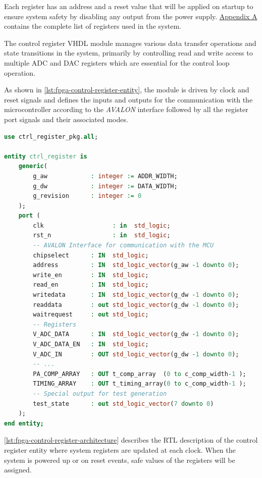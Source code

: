 Each register has an address and a reset value that will be applied on startup
to ensure system safety by disabling any output from the power supply.
\hyperref[sec:hvs-fpga-register-map]{Appendix A} contains the complete list
of registers used in the system.


The control register VHDL module manages various data transfer operations and
state transitions in the system, primarily by controlling read and write access
to multiple \acs{ADC} and \acs{DAC} registers which are essential for the
control loop operation.

As shown in \autoref{lst:fpga-control-register-entity}, the module is driven
by clock and reset signals and defines the inputs and outputs for the
communication with the microcontroller according to the \emph{AVALON} interface
followed by all the register port signals and their associated modes.

\begin{lstlisting}[language=VHDL, caption={Control registers entity},
    label={lst:fpga-control-register-entity}]
use ctrl_register_pkg.all;

entity ctrl_register is
    generic(
        g_aw            : integer := ADDR_WIDTH;
        g_dw            : integer := DATA_WIDTH;
        g_revision      : integer := 0
    );
    port (
        clk                   : in  std_logic;
        rst_n                 : in  std_logic;
        -- AVALON Interface for communication with the MCU
        chipselect      : IN  std_logic;
        address         : IN  std_logic_vector(g_aw -1 downto 0);
        write_en        : IN  std_logic;
        read_en         : IN  std_logic;
        writedata       : IN  std_logic_vector(g_dw -1 downto 0);
        readdata        : out std_logic_vector(g_dw -1 downto 0);
        waitrequest     : out std_logic;
        -- Registers
        V_ADC_DATA      : IN  std_logic_vector(g_dw -1 downto 0);
        V_ADC_DATA_EN   : IN  std_logic;
        V_ADC_IN        : OUT std_logic_vector(g_dw -1 downto 0);
        -- ...
        PA_COMP_ARRAY   : OUT t_comp_array  (0 to c_comp_width-1 );
        TIMING_ARRAY    : OUT t_timing_array(0 to c_comp_width-1 );
        -- Special output for test generation
        test_state      : out std_logic_vector(7 downto 0)
    );
end entity;
\end{lstlisting}

\autoref{lst:fpga-control-register-architecture} describes the \ac{RTL}
description of the control register entity where system registers are
updated at each clock.
When the system is powered up or on reset events, safe values of
the registers will be assigned.

